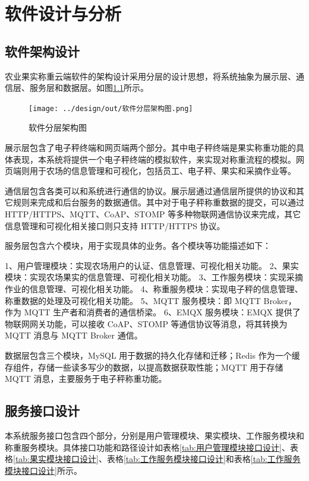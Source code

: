 \chapter{软件设计与分析}

\section{软件架构设计}

农业果实称重云端软件的架构设计采用分层的设计思想，将系统抽象为展示层、通信层、服务层和数据层。如图\ref{fig:软件分层架构图}所示。

\begin{figure}[H]
    \centering
    \texttt{[image: ../design/out/软件分层架构图.png]}
    \caption{软件分层架构图}
    \label{fig:软件分层架构图}
\end{figure}

展示层包含了电子秤终端和网页端两个部分。其中电子秤终端是果实称重功能的具体表现，本系统将提供一个电子秤终端的模拟软件，来实现对称重流程的模拟。网页端则用于农场的信息管理和可视化，包括员工、电子秤、果实和采摘作业等。

通信层包含各类可以和系统进行通信的协议。展示层通过通信层所提供的协议和其它规则来完成和后台服务的数据通信。其中对于电子秤称重数据的提交，可以通过 HTTP/HTTPS、MQTT、CoAP、STOMP 等多种物联网通信协议来完成，其它信息管理和可视化相关接口则只支持 HTTP/HTTPS 协议。

服务层包含六个模块，用于实现具体的业务。各个模块等功能描述如下：

1、用户管理模块：实现农场用户的认证、信息管理、可视化相关功能。
2、果实模块：实现农场果实的信息管理、可视化相关功能。
3、工作服务模块：实现采摘作业的信息管理、可视化相关功能。
4、称重服务模块：实现电子秤的信息管理、称重数据的处理及可视化相关功能。
5、MQTT 服务模块：即 MQTT Broker，作为 MQTT 生产者和消费者的通信桥梁。
6、EMQX 服务模块：EMQX 提供了物联网网关功能，可以接收 CoAP、STOMP 等通信协议等消息，将其转换为 MQTT 消息与 MQTT Broker 通信。

数据层包含三个模块，MySQL 用于数据的持久化存储和迁移；Redis 作为一个缓存组件，存储一些读多写少的数据，以提高数据获取性能；MQTT 用于存储 MQTT 消息，主要服务于电子秤称重功能。

\section{服务接口设计}

本系统服务接口包含四个部分，分别是用户管理模块、果实模块、工作服务模块和称重服务模块。具体接口功能和路径设计如表格\ref{tab:用户管理模块接口设计}、表格\ref{tab:果实模块接口设计}、表格\ref{tab:工作服务模块接口设计}和表格\ref{tab:工作服务模块接口设计}所示。

